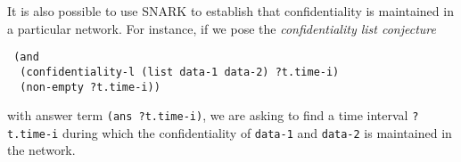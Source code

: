 It is also possible to use SNARK to establish that confidentiality is maintained in a particular network.  
For instance, if we pose the \textit{confidentiality list conjecture}
\begin{verbatim}
 (and
  (confidentiality-l (list data-1 data-2) ?t.time-i)    
  (non-empty ?t.time-i))
\end{verbatim}
with answer term \verb'(ans ?t.time-i)', we are asking to find a time interval 
\verb'?t.time-i' during which the confidentiality of \verb'data-1' and \verb'data-2' is maintained in the network.